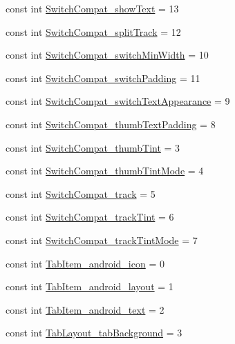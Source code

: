 \begin{CompactItemize}
const int \hyperlink{class__2doo_1_1_droid_1_1_resource_1_1_styleable_a09615ccead27da2e17171bd6815a537}{SwitchCompat\_\-showText} = 13
\item 
const int \hyperlink{class__2doo_1_1_droid_1_1_resource_1_1_styleable_2a046bf4acc382f91820e82a4b22dcd6}{SwitchCompat\_\-splitTrack} = 12
\item 
const int \hyperlink{class__2doo_1_1_droid_1_1_resource_1_1_styleable_9288d5e0b4615e2abac67f1bac66223c}{SwitchCompat\_\-switchMinWidth} = 10
\item 
const int \hyperlink{class__2doo_1_1_droid_1_1_resource_1_1_styleable_b19445dfed3b7245eff0cb8f0d2524f0}{SwitchCompat\_\-switchPadding} = 11
\item 
const int \hyperlink{class__2doo_1_1_droid_1_1_resource_1_1_styleable_681ebc2a21ca9f56fe310731a49871e9}{SwitchCompat\_\-switchTextAppearance} = 9
\item 
const int \hyperlink{class__2doo_1_1_droid_1_1_resource_1_1_styleable_5404f1cef5d00a43600fd4889af82a7e}{SwitchCompat\_\-thumbTextPadding} = 8
\item 
const int \hyperlink{class__2doo_1_1_droid_1_1_resource_1_1_styleable_01e2653afe7c4e9ce09f5751b0dd5200}{SwitchCompat\_\-thumbTint} = 3
\item 
const int \hyperlink{class__2doo_1_1_droid_1_1_resource_1_1_styleable_79d66e9a4f3437f107cb4357d5972b94}{SwitchCompat\_\-thumbTintMode} = 4
\item 
const int \hyperlink{class__2doo_1_1_droid_1_1_resource_1_1_styleable_ae7000788c9a1217ef418e6afb12c536}{SwitchCompat\_\-track} = 5
\item 
const int \hyperlink{class__2doo_1_1_droid_1_1_resource_1_1_styleable_d7f9b7bb738543049cc78874ad9e1a14}{SwitchCompat\_\-trackTint} = 6
\item 
const int \hyperlink{class__2doo_1_1_droid_1_1_resource_1_1_styleable_813e6aa02f3614c387dff846860c940b}{SwitchCompat\_\-trackTintMode} = 7
\item 
const int \hyperlink{class__2doo_1_1_droid_1_1_resource_1_1_styleable_a8673c2ed978e70d92aed22939be2765}{TabItem\_\-android\_\-icon} = 0
\item 
const int \hyperlink{class__2doo_1_1_droid_1_1_resource_1_1_styleable_0c69e292d8e94b2051b2ec3353764a8d}{TabItem\_\-android\_\-layout} = 1
\item 
const int \hyperlink{class__2doo_1_1_droid_1_1_resource_1_1_styleable_0f832ffc7e09a2c0407329c58e80eb6b}{TabItem\_\-android\_\-text} = 2
\item 
const int \hyperlink{class__2doo_1_1_droid_1_1_resource_1_1_styleable_364a6ede4f8ce8372da072956852c622}{TabLayout\_\-tabBackground} = 3

\end{CompactItemize}
